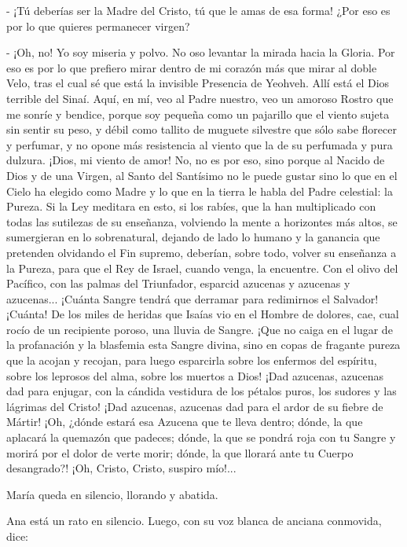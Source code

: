 \documentclass[12pt, twoside, openright]{book} %
\begin{document}
- ¡Tú deberías ser la Madre del Cristo, tú que le amas de esa forma! ¿Por eso es por lo que quieres permanecer virgen? 

- ¡Oh, no! Yo soy miseria y polvo. No oso levantar la mirada hacia la Gloria. Por eso es por lo que prefiero mirar dentro de mi corazón más que mirar al doble Velo, tras el cual sé que está la invisible Presencia de Yeohveh. Allí está el Dios terrible del Sinaí. Aquí, en mí, veo al Padre nuestro, veo un amoroso Rostro que me sonríe y bendice, porque soy pequeña como un pajarillo que el viento sujeta sin sentir su peso, y débil como tallito de muguete silvestre que sólo sabe florecer y perfumar, y no opone más resistencia al viento que la de su perfumada y pura dulzura. ¡Dios, mi viento de amor! No, no es por eso, sino porque al Nacido de Dios y de una Virgen, al Santo del Santísimo no le puede gustar sino lo que en el Cielo ha elegido como Madre y lo que en la tierra le habla del Padre celestial: la Pureza. Si la Ley meditara en esto, si los rabíes, que la han multiplicado con todas las sutilezas de su enseñanza, volviendo la mente a horizontes más altos, se sumergieran en lo sobrenatural, dejando de lado lo humano y la ganancia que pretenden olvidando el Fin supremo, deberían, sobre todo, volver su enseñanza a la Pureza, para que el Rey de Israel, cuando venga, la encuentre. Con el olivo del Pacífico, con las palmas del Triunfador, esparcid azucenas y azucenas y azucenas... ¡Cuánta Sangre tendrá que derramar para redimirnos el Salvador! ¡Cuánta! De los miles de heridas que Isaías vio en el Hombre de dolores, cae, cual rocío de un recipiente poroso, una lluvia de Sangre. ¡Que no caiga en el lugar de la profanación y la blasfemia esta Sangre divina, sino en copas de fragante pureza que la acojan y recojan, para luego esparcirla sobre los enfermos del espíritu, sobre los leprosos del alma, sobre los muertos a Dios! ¡Dad azucenas, azucenas dad para enjugar, con la cándida vestidura de los pétalos puros, los sudores y las lágrimas del Cristo! ¡Dad azucenas, azucenas dad para el ardor de su fiebre de Mártir! ¡Oh, ¿dónde estará esa Azucena que te lleva dentro; dónde, la que aplacará la quemazón que padeces; dónde, la que se pondrá roja con tu Sangre y morirá por el dolor de verte morir; dónde, la que llorará ante tu Cuerpo desangrado?! ¡Oh, Cristo, Cristo, suspiro mío!... 

María queda en silencio, llorando y abatida. 

Ana está un rato en silencio. Luego, con su voz blanca de anciana conmovida, dice: 
\end{document}
